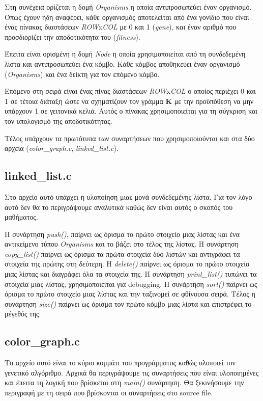 \documentclass{article}
\begin{document}
Στη συνέχεια ορίζεται η δομή \emph{Organisms} η οποία αντιπροσωπεύει έναν
οργανισμό. Όπως έχουν ήδη αναφέρει, κάθε οργανισμός αποτελείται από ένα γονίδιο
που είναι ένας πίνακας διαστάσεων \emph{ROW}x\emph{COL} με 0 και 1 (\emph{gene}),
και έναν αριθμό που προσδιορίζει την αποδοτικότητα του (\emph{fitness}).

Έπειτα είναι ορισμένη η δομή \emph{Node} η οποία χρησιμοποιείται από τη
συνδεδεμένη λίστα και αντιπροσωπεύει ένα κόμβο. Κάθε κόμβος αποθηκεύει έναν
οργανισμό (\emph{Organisms}) και ένα δείκτη για τον επόμενο κόμβο.

Επόμενο στη σειρά είναι ένας πίνας διαστάσεων \emph{ROW}x\emph{COL} ο οποίος
περιέχει 0 και 1 σε τέτοια διάταξη ώστε να σχηματίζουν τον γράμμα \textbf{K} με
την προϋπόθεση να μην υπάρχουν 1 σε γειτονικά κελιά. Αυτός ο πίνακας
χρησιμοποιείται για τη σύγκριση και τον υπολογισμό της αποδοτικότητας.

Τέλος υπάρχουν τα πρωτότυπα των συναρτήσεων που χρησιμοποιούνται και στα δύο
αρχεία (\emph{color\_graph.c}, \emph{linked\_list.c}).

\subsection{linked\_list.c}
Στο αρχείο αυτό υπάρχει η υλοποίηση μιας μονά συνδεδεμένης λίστα. Για τον λόγο
αυτό δεν θα το περιγράψουμε αναλυτικά καθώς δεν είναι αυτός ο σκοπός του
μαθήματος.

Η συνάρτηση \emph{push()}, παίρνει ως όρισμα το πρώτο στοιχείο μιας λίστας και
ένα αντικείμενο τύπου \emph{Organisms} και το βάζει στο τέλος της λίστας. Η
συνάρτηση \emph{copy\_list()} παίρνει ως όρισμα τα πρώτα στοιχεία δύο λιστών και
αντιγράφει τα στοιχεία της πρώτης στη δεύτερη. Η \emph{delete()} παίρνει ως
όρισμα το πρώτο στοιχείο μιας λίστας και διαγράφει όλα τα στοιχεία της. Η
συνάρτηση \emph{print\_list()} τυπώνει τα στοιχεία μιας λίστας, χρησιμοποιείται
για debugging. Η συνάρτηση \emph{sort()} παίρνει ως όρισμα το πρώτο στοιχείο
μιας λίστας και την ταξινομεί σε φθίνουσα σειρά. Τέλος η συνάρτηση \emph{size()}
παίρνει ως όρισμα τον πρώτο κόμβο μιας λίστα και επιστρέφει το μέγεθός της.

\subsection{color\_graph.c}
Το αρχείο αυτό είναι το κύριο κομμάτι του προγράμματος καθώς υλοποιεί τον
γενετικό αλγόριθμο. Αρχικά θα περιγράψουμε τις συναρτήσεις που είναι
υλοποιημένες και έπειτα τη λογική που βρίσκεται στη \emph{main()} συνάρτηση. Θα
ξεκινήσουμε την περιγραφή με τη σειρά που βρίσκονται οι συναρτήσεις στο source
file.
\end{document}
